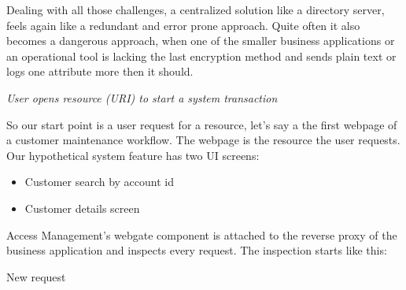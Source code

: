 Dealing with all those challenges, a centralized solution like a directory server, feels again like a redundant and error prone approach. Quite often it also becomes a dangerous approach, when one of the smaller business applications or an operational tool is lacking the last encryption method and sends plain text or logs one attribute more then it should.







\emph{User opens resource (URI) to start a system transaction}

So our start point is a user request for a resource, let's say a the first webpage of a customer maintenance workflow. The webpage is the resource the user requests. Our hypothetical system feature has two UI screens:

\begin{itemize}
    \item Customer search by account id
    \item Customer details screen
\end{itemize}

Access Management's webgate component is attached to the reverse proxy of the business application and inspects every request. The inspection starts like this:

New request 






